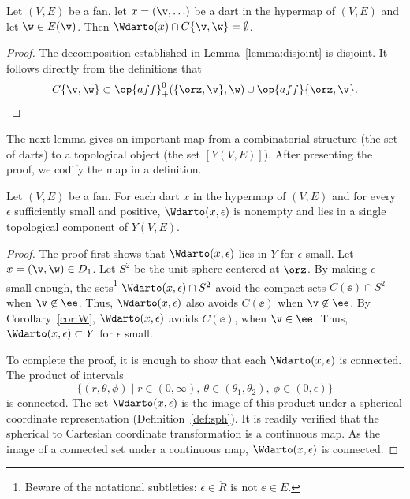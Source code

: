 \begin{corollary}[disjointness]\label{cor:W}
  Let $(V,E)$ be a fan, let $x = (\v,\ldots)$ be a dart in the
  hypermap of $(V,E)$ and let $\w\in E(\v)$.  Then $\Wdarto(x)\cap
  C\{\v,\w\}=\emptyset$.
\end{corollary}

\begin{proof} The decomposition established in
  Lemma~\ref{lemma:disjoint} is disjoint.  It follows directly from
  the definitions that
\[ C\{\v,\w\}\subset \op{aff}_+^0(\{\orz,\v\},\w) \cup 
\op{aff}\{\orz,\v\}.\] 
\end{proof}

The next lemma gives an important map from a combinatorial structure (the
set of darts) to a topological object  (the set $[Y(V,E)]$).  After presenting the
proof, we  codify the map in a definition.

\begin{lemma} 
Let $(V,E)$ be a fan.
For each dart $x$ in the hypermap of $(V,E)$
and for every $\epsilon$ sufficiently small and positive,
$\Wdarto(x,\epsilon)$ is nonempty and lies in a single 
topological component of $Y(V,E)$.
\end{lemma}
%
%

\begin{proof} The proof first shows that $\Wdarto(x,\epsilon)$ lies in
  $Y$ for $\epsilon$ small.  Let $x=(\v,\w)\in D_1$.  Let $S^2$ be
  the unit sphere centered at $\orz$.  By making $\epsilon$ small
  enough, the sets\footnote{Beware of the notational subtleties:
    $\epsilon\in\ring{R}$ is not $\ee\in E$.}  $\Wdarto(x,\epsilon)\cap
  S^2$ avoid the compact sets $C(\ee)\cap S^2$ when $\v\not\in \ee$.
  Thus, $\Wdarto(x,\epsilon)$ also avoids $C(\ee)$ when $\v\not\in
  \ee$.  By Corollary~\ref{cor:W}, $\Wdarto(x,\epsilon)$ avoids
  $C(\ee)$, when $\v\in \ee$.  Thus, $\Wdarto(x,\epsilon)\subset Y$ for $\epsilon$ small.

To complete the proof, it is enough to show that each
$\Wdarto(x,\epsilon)$ is connected.  The product of intervals
\[ 
\{(r,\theta,\phi) \mid r\in (0,\infty),
~\theta\in (\theta_1,\theta_2),~\phi\in (0,\epsilon)\}
\] 
is connected.  The set $\Wdarto(x,\epsilon)$ is the image of this
product under a spherical coordinate representation
(Definition~\ref{def:sph}).  %
It is readily verified that the spherical to Cartesian coordinate
transformation is a continuous map. As the image of a connected set
under a continuous map, $\Wdarto(x,\epsilon)$ is connected.
\end{proof}
%
%



